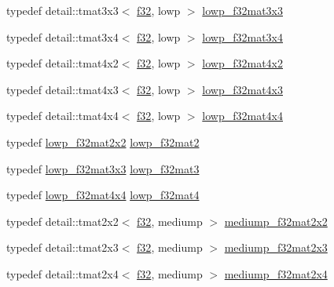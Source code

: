 \begin{CompactItemize}
\item 
typedef detail::tmat3x3$<$ \hyperlink{group__gtc__type__precision_g0ec999b57f5330d9021256e96038df04}{f32}, lowp $>$ \hyperlink{group__gtc__type__precision_g92f4b130a9651c69361600272f113542}{lowp\_\-f32mat3x3}
\item 
typedef detail::tmat3x4$<$ \hyperlink{group__gtc__type__precision_g0ec999b57f5330d9021256e96038df04}{f32}, lowp $>$ \hyperlink{group__gtc__type__precision_g7f81032f05c8a1b96b33c328f38c72d3}{lowp\_\-f32mat3x4}
\item 
typedef detail::tmat4x2$<$ \hyperlink{group__gtc__type__precision_g0ec999b57f5330d9021256e96038df04}{f32}, lowp $>$ \hyperlink{group__gtc__type__precision_g6eedee3981e5bf150ad7463786d0d694}{lowp\_\-f32mat4x2}
\item 
typedef detail::tmat4x3$<$ \hyperlink{group__gtc__type__precision_g0ec999b57f5330d9021256e96038df04}{f32}, lowp $>$ \hyperlink{group__gtc__type__precision_gdd0ff5b09c6ecac83e4e908e3f6478c7}{lowp\_\-f32mat4x3}
\item 
typedef detail::tmat4x4$<$ \hyperlink{group__gtc__type__precision_g0ec999b57f5330d9021256e96038df04}{f32}, lowp $>$ \hyperlink{group__gtc__type__precision_gb7a6454e1f5d5c434ff316b139eb0231}{lowp\_\-f32mat4x4}
\item 
typedef \hyperlink{group__gtc__type__precision_ge5beaa9212ba199167c7c7088a70b2bd}{lowp\_\-f32mat2x2} \hyperlink{group__gtc__type__precision_gd717448ef1129d7b795ebcfee6c4944c}{lowp\_\-f32mat2}
\item 
typedef \hyperlink{group__gtc__type__precision_g92f4b130a9651c69361600272f113542}{lowp\_\-f32mat3x3} \hyperlink{group__gtc__type__precision_g84500ab23c0f0f3c585f8ad02f33b88c}{lowp\_\-f32mat3}
\item 
typedef \hyperlink{group__gtc__type__precision_gb7a6454e1f5d5c434ff316b139eb0231}{lowp\_\-f32mat4x4} \hyperlink{group__gtc__type__precision_gda4d11f44b410c1be7b6b1d05ccf692c}{lowp\_\-f32mat4}
\item 
typedef detail::tmat2x2$<$ \hyperlink{group__gtc__type__precision_g0ec999b57f5330d9021256e96038df04}{f32}, mediump $>$ \hyperlink{group__gtc__type__precision_g23c9239d6aa9b41c3d2145e2faa81edb}{mediump\_\-f32mat2x2}
\item 
typedef detail::tmat2x3$<$ \hyperlink{group__gtc__type__precision_g0ec999b57f5330d9021256e96038df04}{f32}, mediump $>$ \hyperlink{group__gtc__type__precision_g42497d19668931d225bccf1b9c614c19}{mediump\_\-f32mat2x3}
\item 
typedef detail::tmat2x4$<$ \hyperlink{group__gtc__type__precision_g0ec999b57f5330d9021256e96038df04}{f32}, mediump $>$ \hyperlink{group__gtc__type__precision_g20c5b3b715b70f1c09f7f95bfaa7aa84}{mediump\_\-f32mat2x4}

\end{CompactItemize}
